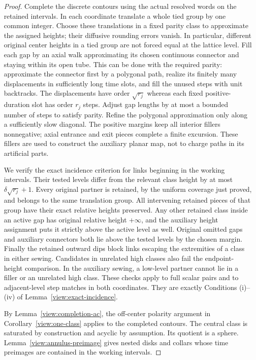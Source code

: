 \begin{proof}
Complete the discrete contours using the actual resolved words on the
retained intervals.  In each coordinate translate a whole tied group by
one common integer.  Choose these translations in a fixed parity class
to approximate the assigned heights; their diffusive rounding errors
vanish.  In particular, different original center heights in a tied
group are not forced equal at the lattice level.  Fill each gap by an
axial walk approximating its chosen continuous connector and staying
within its open tube.  This can be done with the required parity:
approximate the connector first by a polygonal path, realize its finitely
many displacements in sufficiently long time slots, and fill the unused
steps with unit backtracks.  The displacements have order $\sqrt{r_j}$
whereas each fixed positive-duration slot has order $r_j$ steps.  Adjust
gap lengths by at most a bounded number of steps to satisfy parity.
Refine the polygonal approximation only along a sufficiently slow
diagonal.  The positive margins keep all interior fillers nonnegative;
axial entrance and exit pieces complete a finite excursion.  These
fillers are used to construct the auxiliary planar map, not to charge
paths in its artificial parts.

We verify the exact incidence criterion for links beginning in the
working intervals.  Their tested levels differ from the relevant class
height by at most $\delta\sqrt{r_j}+1$.  Every original partner is
retained, by the uniform coverage just proved, and belongs to the same
translation group.  All intervening retained pieces of that group have
their exact relative heights preserved.  Any other retained class inside
an active gap has original relative height $+\infty$, and the auxiliary
height assignment puts it strictly above the active level as well.
Original omitted gaps and auxiliary connectors both lie above the tested
levels by the chosen margin.  Finally the retained outward dips block
links escaping the extremities of a class in either sewing.  Candidates
in unrelated high classes also fail the endpoint-height comparison.  In the
auxiliary sewing, a low-level partner cannot lie in a filler or an
unrelated high class.  These checks apply to full scalar pairs and to
adjacent-level step matches in both coordinates.  They are exactly
Conditions (i)--(iv) of Lemma~\ref{view:exact-incidence}.

By Lemma~\ref{view:completion-ac}, the off-center polarity argument in
Corollary~\ref{view:one-class} applies to the completed contours.  The
central class is saturated by construction and acyclic by assumption.
Its quotient is a sphere.  Lemma~\ref{view:annulus-preimage} gives nested
disks and collars whose time preimages are contained in the working
intervals.


\end{proof}
